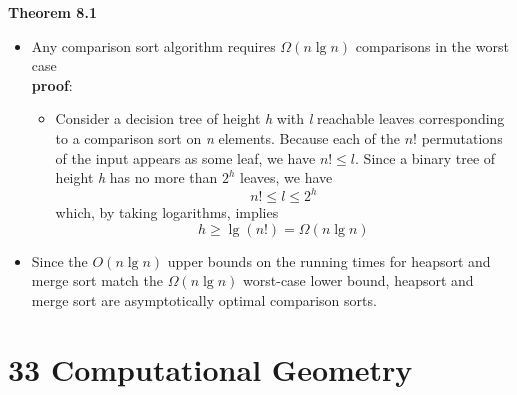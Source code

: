 \documentclass{report}
\begin{document}
\textbf{Theorem 8.1}
\begin{itemize}
    \item Any comparison sort algorithm requires $\Omega(n \lg n)$ comparisons in the worst case \\
    \textbf{proof}:
    \begin{itemize}
        \item Consider a decision tree of height \textit{h} with \textit{l} reachable leaves corresponding to a comparison sort on \textit{n} elements. Because each of the $n!$ permutations of the input appears as some leaf, we have $n! \leq l$. Since a binary tree of height \textit{h} has no more than $2^h$ leaves, we have
        $$n! \leq l \leq 2^h$$
        which, by taking logarithms, implies
        $$h \geq \lg(n!) = \Omega(n \lg n)$$
    \end{itemize}
    \item Since the $O(n \lg n)$ upper bounds on the running times for heapsort and merge sort match the $\Omega(n \lg n)$ worst-case lower bound, heapsort and merge sort are asymptotically optimal comparison sorts.
\end{itemize}

\section*{33 Computational Geometry}
\end{document}
